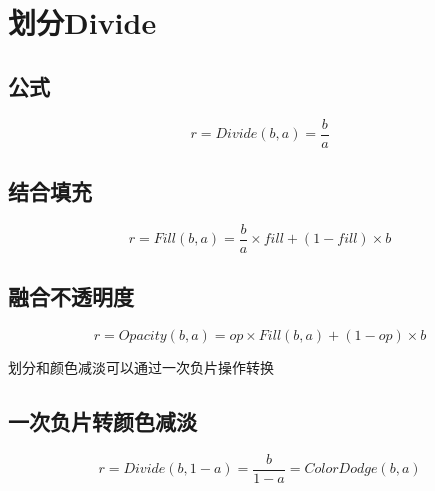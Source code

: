 %
\newpage
\section{ 划分Divide}

\subsection{ 公式}

\begin{equation}r=Divide(b,a)= \dfrac{b}{a}\end{equation}

\subsection{ 结合填充}

\begin{equation}r=Fill(b,a)= \dfrac{b}{a}\times fill + (1-fill)\times b\end{equation}

\subsection{ 融合不透明度}

\begin{equation}r=Opacity(b,a)=op\times Fill(b,a)+(1-op)\times b\end{equation}

划分和颜色减淡可以通过一次负片操作转换

\subsection{ 一次负片转颜色减淡}

\begin{equation}r=Divide(b,1-a)=\dfrac{b}{1-a}=ColorDodge(b,a)\end{equation}

